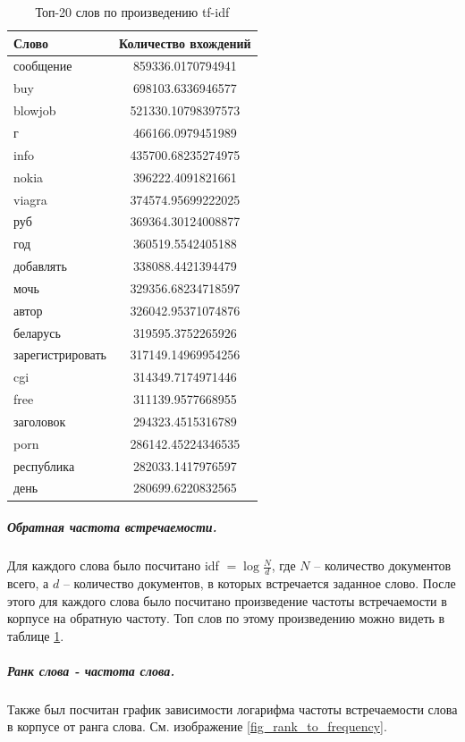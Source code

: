 \begin{table}
	\begin{center}
		\begin{tabular}{|l|c|}
			\hline
			Слово & Количество вхождений\\
			\hline
			сообщение &859336.0170794941\\
			buy &698103.6336946577\\
			blowjob &521330.10798397573\\
			г &466166.0979451989\\
			info &435700.68235274975\\
			nokia &396222.4091821661\\
			viagra &374574.95699222025\\
			руб &369364.30124008877\\
			год &360519.5542405188\\
			добавлять &338088.4421394479\\
			мочь &329356.68234718597\\
			автор &326042.95371074876\\
			беларусь &319595.3752265926\\
			зарегистрировать &317149.14969954256\\
			cgi &314349.7174971446\\
			free &311139.9577668955\\
			заголовок &294323.4515316789\\
			porn &286142.45224346535\\
			республика &282033.1417976597\\
			день &280699.6220832565\\
			\hline
		\end{tabular}
	\end{center}
	\caption{Топ-20 слов по произведению tf-idf}
	\label{table_tf_idf_top}
\end{table}

\subparagraph{Обратная частота встречаемости.}
	Для каждого слова было посчитано idf $ = \log \frac{N}{d}$, где $N$ -- количество документов всего, а $d$ -- количество документов, в которых встречается заданное слово. После этого для каждого слова было посчитано произведение частоты встречаемости в корпусе на обратную частоту. Топ слов по этому произведению можно видеть в таблице \ref{table_tf_idf_top}. 

\subparagraph{Ранк слова - частота слова.}

Также был посчитан график зависимости логарифма частоты встречаемости слова в корпусе от ранга слова. См. изображение \ref{fig_rank_to_frequency}. 

